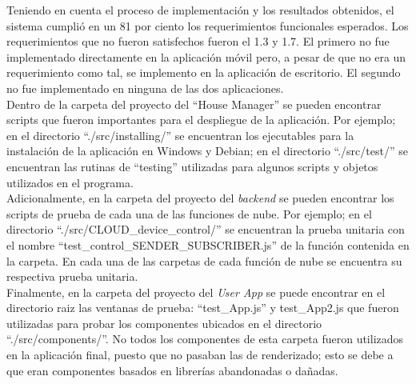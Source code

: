 Teniendo en cuenta el proceso de implementación y los resultados obtenidos, el sistema cumplió en un 81 por ciento los requerimientos funcionales esperados. Los requerimientos que no fueron satisfechos fueron el 1.3 y 1.7. El primero no fue implementado directamente en la aplicación móvil pero, a pesar de que no era un requerimiento como tal, se implemento en la aplicación de escritorio. El segundo no fue implementado en ninguna de las dos aplicaciones.
\vspace{0.5cm}\\
Dentro de la carpeta del proyecto del ``House Manager'' se pueden encontrar scripts que fueron importantes para el despliegue de la aplicación. Por ejemplo; en el directorio ``./src/installing/'' se encuentran los ejecutables para la instalación de la aplicación en Windows y Debian; en el directorio ``./src/test/'' se encuentran las rutinas de “testing” utilizadas para algunos scripts y objetos utilizados en el programa.
\vspace{0.5cm}\\
Adicionalmente, en la carpeta del proyecto del \textit{backend} se pueden encontrar los scripts de prueba de cada una de las funciones de nube. Por ejemplo; en el directorio ``./src/CLOUD\_device\_control/'' se encuentran la prueba unitaria con el nombre ``test\_control\_SENDER\_SUBSCRIBER.js'' de la función contenida en la carpeta. En cada una de las carpetas de cada función de nube se encuentra su respectiva prueba unitaria.
\vspace{0.5cm}\\
Finalmente, en la carpeta del proyecto del \textit{User App} se puede encontrar en el directorio raiz las ventanas de prueba: ``test\_App.js'' y test\_App2.js que fueron utilizadas para probar los componentes ubicados en el directorio ``./src/components/''. No todos los componentes de esta carpeta fueron utilizados en la aplicación final, puesto que no pasaban las de renderizado; esto se debe a que eran componentes basados en librerías abandonadas o dañadas.